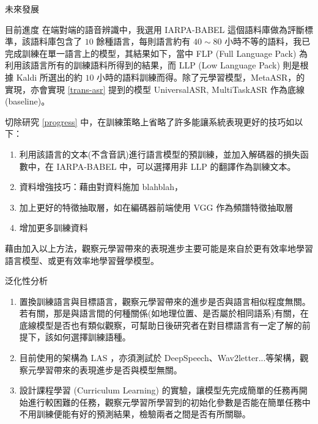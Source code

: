 \documentclass[12pt]{extarticle}
\begin{document}
\begin{section}{未來發展}
  \begin{subsection}{目前進度} \label{progress}
    在端對端的語音辨識中，我選用 IARPA-BABEL 這個語料庫做為評斷標準，該語料庫包含了 $10$ 餘種語言，每則語言約有 $40 \sim 80$ 小時不等的語料，我已完成訓練在單一語言上的模型，其結果如下，當中 FLP (Full Language Pack) 為利用該語言所有的訓練語料所得到的結果，而 LLP (Low Language Pack) 則是根據 Kaldi 所選出的約 $10$ 小時的語料訓練而得。除了元學習模型，MetaASR，的實現，亦會實現 \ref{trans-asr} 提到的模型 UniversalASR, MultiTaskASR 作為底線 (baseline)。
  \end{subsection}

  \begin{subsection}{切除研究}
    \ref{progress} 中，在訓練策略上省略了許多能讓系統表現更好的技巧如以下：
    \begin{enumerate}[itemsep=-2mm]
      \item 利用該語言的文本(不含音訊)進行語言模型的預訓練，並加入解碼器的損失函數中，在 IARPA-BABEL 中，可以選擇用非 LLP 的翻譯作為訓練文本。
      \item 資料增強技巧：藉由對資料施加 blahblah，
      \item 加上更好的特徵抽取層，如在編碼器前端使用 VGG 作為頻譜特徵抽取層
      \item 增加更多訓練資料
    \end{enumerate}
    藉由加入以上方法，觀察元學習帶來的表現進步主要可能是來自於更有效率地學習語言模型、或更有效率地學習聲學模型。
  \end{subsection}

  \begin{subsection}{泛化性分析}
    \begin{enumerate}[itemsep=-1mm]
      \item 置換訓練語言與目標語言，觀察元學習帶來的進步是否與語言相似程度無關。若有關，那是與語言間的何種關係(如地理位置、是否屬於相同語系)有關，在底線模型是否也有類似觀察，可幫助日後研究者在對目標語言有一定了解的前提下，該如何選擇訓練語種。
      \item 目前使用的架構為 LAS \cite{chan2016listen}，亦須測試於 DeepSpeech、Wav2letter...等架構，觀察元學習帶來的表現進步是否與模型無關。
      \item 設計課程學習 (Curriculum Learning) 的實驗，讓模型先完成簡單的任務再開始進行較困難的任務，觀察元學習所學習到的初始化參數是否能在簡單任務中不用訓練便能有好的預測結果，檢驗兩者之間是否有所關聯。
    \end{enumerate}   
  \end{subsection}
\end{section}



\end{document}
